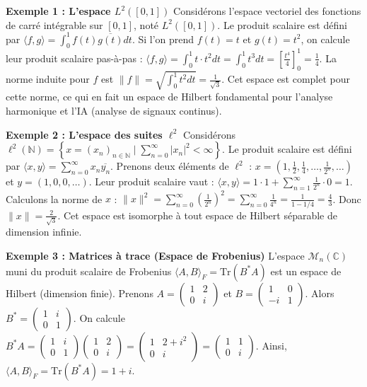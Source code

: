 \documentclass[11pt,a4paper]{article}
\begin{document}
\textbf{Exemple 1 : L'espace $L^2([0, 1])$}
Considérons l'espace vectoriel des fonctions de carré intégrable sur $[0, 1]$, noté $L^2([0, 1])$. Le produit scalaire est défini par $\langle f, g \rangle = \int_0^1 f(t) \overline{g(t)} dt$.
Si l'on prend $f(t) = t$ et $g(t) = t^2$, on calcule leur produit scalaire pas-à-pas :
$\langle f, g \rangle = \int_0^1 t \cdot t^2 dt = \int_0^1 t^3 dt = \left[ \frac{t^4}{4} \right]_0^1 = \frac{1}{4}$.
La norme induite pour $f$ est $\|f\| = \sqrt{\int_0^1 t^2 dt} = \frac{1}{\sqrt{3}}$. Cet espace est complet pour cette norme, ce qui en fait un espace de Hilbert fondamental pour l'analyse harmonique et l'IA (analyse de signaux continus).

\textbf{Exemple 2 : L'espace des suites $\ell^2$}
Considérons $\ell^2(\mathbb{N}) = \left\{ x = (x_n)_{n \in \mathbb{N}} \mid \sum_{n=0}^\infty |x_n|^2 < \infty \right\}$.
Le produit scalaire est défini par $\langle x, y \rangle = \sum_{n=0}^\infty x_n \overline{y_n}$.
Prenons deux éléments de $\ell^2$ : $x = (1, \frac{1}{2}, \frac{1}{4}, \dots, \frac{1}{2^n}, \dots)$ et $y = (1, 0, 0, \dots)$.
Leur produit scalaire vaut : $\langle x, y \rangle = 1 \cdot 1 + \sum_{n=1}^\infty \frac{1}{2^n} \cdot 0 = 1$.
Calculons la norme de $x$ : $\|x\|^2 = \sum_{n=0}^\infty \left(\frac{1}{2^n}\right)^2 = \sum_{n=0}^\infty \frac{1}{4^n} = \frac{1}{1 - 1/4} = \frac{4}{3}$. Donc $\|x\| = \frac{2}{\sqrt{3}}$.
Cet espace est isomorphe à tout espace de Hilbert séparable de dimension infinie.

\textbf{Exemple 3 : Matrices à trace (Espace de Frobenius)}
L'espace $\mathcal{M}_n(\mathbb{C})$ muni du produit scalaire de Frobenius $\langle A, B \rangle_F = \text{Tr}(B^* A)$ est un espace de Hilbert (dimension finie).
Prenons $A = \begin{pmatrix} 1 & 2 \\ 0 & i \end{pmatrix}$ et $B = \begin{pmatrix} 1 & 0 \\ -i & 1 \end{pmatrix}$.
Alors $B^* = \begin{pmatrix} 1 & i \\ 0 & 1 \end{pmatrix}$.
On calcule $B^* A = \begin{pmatrix} 1 & i \\ 0 & 1 \end{pmatrix} \begin{pmatrix} 1 & 2 \\ 0 & i \end{pmatrix} = \begin{pmatrix} 1 & 2 + i^2 \\ 0 & i \end{pmatrix} = \begin{pmatrix} 1 & 1 \\ 0 & i \end{pmatrix}$.
Ainsi, $\langle A, B \rangle_F = \text{Tr}(B^* A) = 1 + i$.
\end{document}
